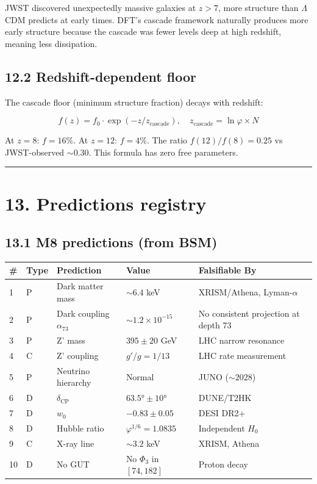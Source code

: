 \documentclass[11pt,a4paper]{article}
\begin{document}
JWST discovered unexpectedly massive galaxies at $z > 7$, more structure than $\Lambda$CDM predicts at early times. DFT's cascade framework naturally produces more early structure because the cascade was fewer levels deep at high redshift, meaning less dissipation.

\subsection*{12.2 Redshift-dependent floor}

The cascade floor (minimum structure fraction) decays with redshift:

\[f(z) = f_0 \cdot \exp(-z/z_{\text{cascade}}), \quad z_{\text{cascade}} = \ln\varphi \times N\]

At $z = 8$: $f = 16\%$. At $z = 12$: $f = 4\%$. The ratio $f(12)/f(8) = 0.25$ vs JWST-observed $\sim 0.30$. This formula has zero free parameters.

\begin{center}\rule{0.5\linewidth}{0.4pt}\end{center}

\section*{13. Predictions registry}

\subsection*{13.1 M8 predictions (from BSM)}

\begin{longtable}[]{@{}lllll@{}}
\toprule
\# & Type & Prediction & Value & Falsifiable By \\
\midrule\endhead
1 & P & Dark matter mass & $\sim 6.4$ keV & XRISM/Athena, Lyman-$\alpha$ \\
2 & P & Dark coupling $\alpha_{73}$ & $\sim 1.2 \times 10^{-15}$ & No consistent projection at depth 73 \\
3 & P & Z' mass & $395 \pm 20$ GeV & LHC narrow resonance \\
4 & C & Z' coupling & $g'/g = 1/13$ & LHC rate measurement \\
5 & P & Neutrino hierarchy & Normal & JUNO ($\sim 2028$) \\
6 & D & $\delta_{\text{CP}}$ & $63.5° \pm 10°$ & DUNE/T2HK \\
7 & D & $w_0$ & $-0.83 \pm 0.05$ & DESI DR2+ \\
8 & D & Hubble ratio & $\varphi^{1/6} = 1.0835$ & Independent $H_0$ \\
9 & C & X-ray line & $\sim 3.2$ keV & XRISM, Athena \\
10 & D & No GUT & No $\Phi_3$ in $[74, 182]$ & Proton decay \\
\bottomrule
\end{longtable}
\end{document}
